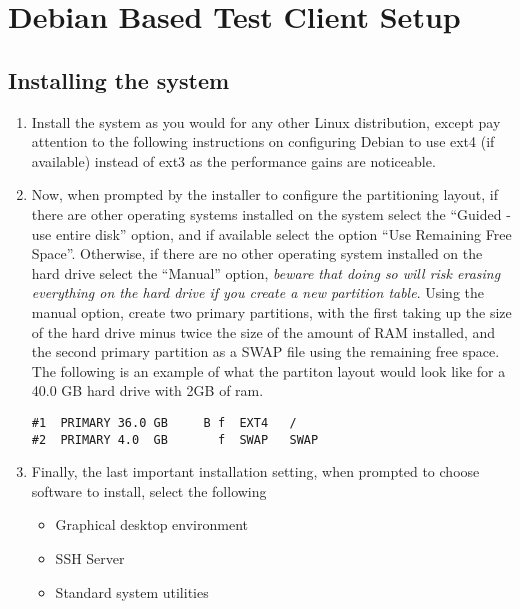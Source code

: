 \section{Debian Based Test Client Setup}
\subsection{Installing the system}
\label{sec:debianinstall}
\flushleft
\begin{enumerate}
\item 	Install the system as you would for any other Linux distribution, except pay attention to the following instructions on
		configuring Debian to use ext4 (if available) instead of ext3 as the performance gains are noticeable.


\item	Now, when prompted by the installer to configure the partitioning layout, if there are other operating systems installed on the 
		system select the ``Guided - use entire disk'' option, and if available select the option ``Use Remaining Free Space''. 
		Otherwise, if there are no other operating system installed on the hard drive select the ``Manual'' option, \emph{beware that 
		doing so will risk erasing everything on the hard drive if you create a new partition table}. Using the manual option, create 
		two primary partitions, with the first taking up the size of the hard drive minus twice the size of the amount of RAM installed, 
		and the second primary partition as a SWAP file using the remaining free space. The following is an example of what the partiton 
		layout would look like for a 40.0 GB hard drive with 2GB of ram.

\lstset{language=bash,caption=Manual Partition Layout Example}
\begin{lstlisting}
#1	PRIMARY	36.0 GB		B f	 EXT4	/
#2	PRIMARY	4.0  GB		  f	 SWAP	SWAP
\end{lstlisting}

\item 	Finally, the last important installation setting, when prompted to choose software to install, select the following
\begin{itemize}
\item 	Graphical desktop environment
\item 	SSH Server
\item	Standard system utilities
\end{itemize}
\end{enumerate}




